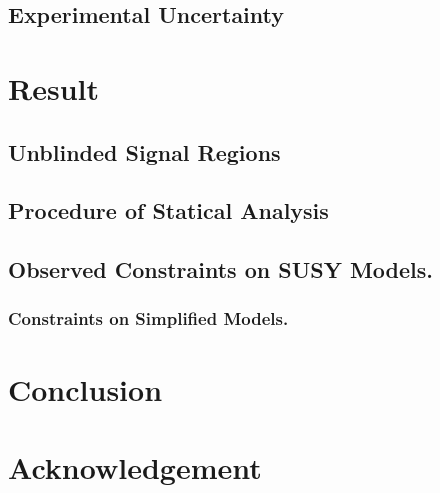 	\subsection{Experimental Uncertainty}
%
\section{Result} 
	\subsection{Unblinded Signal Regions}
	\subsection{Procedure of Statical Analysis}
	\subsection{Observed Constraints on SUSY Models.}
		\subsubsection{Constraints on Simplified Models.} 
%
\section{Conclusion} 

\section{Acknowledgement}